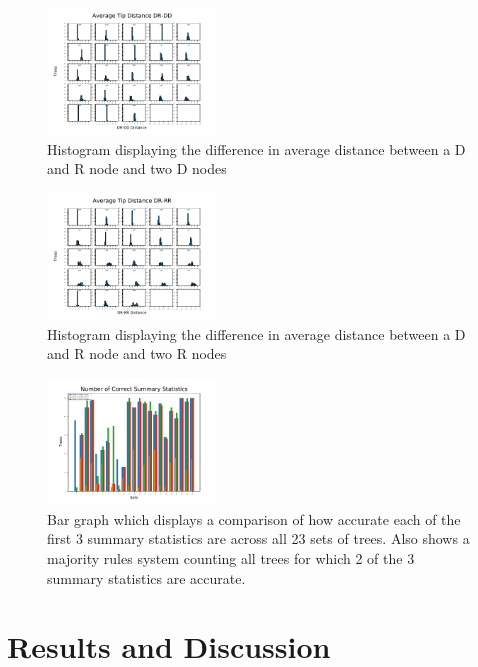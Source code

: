 \documentclass[final,5p,times,twocolumn,authoryear]{elsarticle}
\begin{document}
\begin{figure}
	\centering 
	\includegraphics[width=0.4\textwidth, angle=0]{dr_dd_distance.pdf}	
	\caption{Histogram displaying the difference in average distance between a D and R node and two D nodes} 
	\label{fig_mom0}%
\end{figure}

\begin{figure}
	\centering 
	\includegraphics[width=0.4\textwidth, angle=0]{dr_rr_distance.pdf}	
	\caption{Histogram displaying the difference in average distance between a D and R node and two R nodes} 
	\label{fig_mom0}%
\end{figure}

\begin{figure}
  \centering
  \includegraphics[width=0.4\textwidth, angle=0]{correctsumstats}
  \caption{Bar graph which displays a comparison of how accurate each of the first 3 summary statistics are across all 23 sets of trees. Also shows a majority rules system counting all trees for which 2 of the 3 summary statistics are accurate.}
  \label{fig_mom0}%
\end{figure}

\section{Results and Discussion}
\label{results and discussion}
\end{document}
